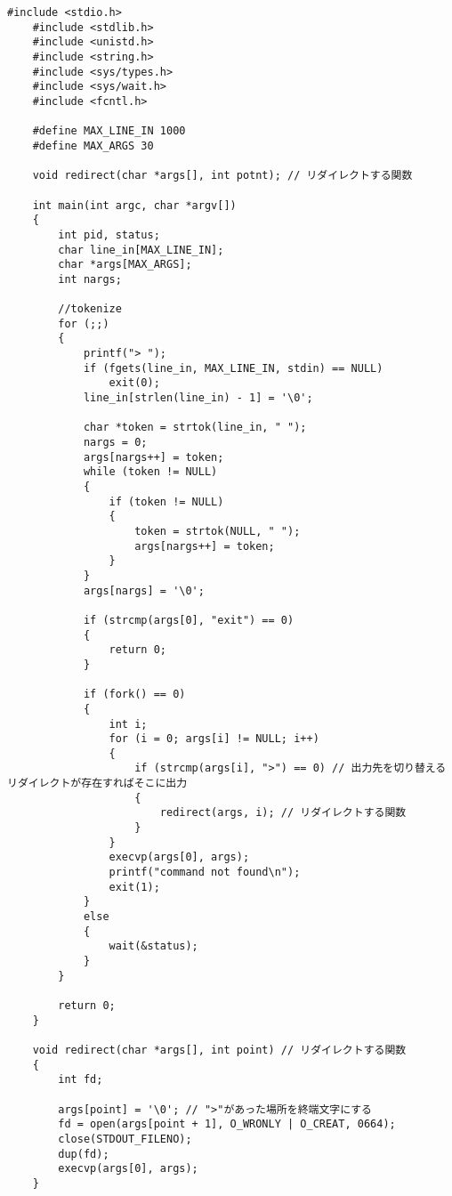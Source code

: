 \documentclass[12pt]{jarticle}
\begin{document}
\begin{lstlisting}[caption=kadai4.c,label=kadai4, style=lstC]
    #include <stdio.h>
    #include <stdlib.h>
    #include <unistd.h>
    #include <string.h>
    #include <sys/types.h>
    #include <sys/wait.h>
    #include <fcntl.h>
    
    #define MAX_LINE_IN 1000
    #define MAX_ARGS 30
    
    void redirect(char *args[], int potnt); // リダイレクトする関数
    
    int main(int argc, char *argv[])
    {
        int pid, status;
        char line_in[MAX_LINE_IN];
        char *args[MAX_ARGS];
        int nargs;
    
        //tokenize
        for (;;)
        {
            printf("> ");
            if (fgets(line_in, MAX_LINE_IN, stdin) == NULL)
                exit(0);
            line_in[strlen(line_in) - 1] = '\0';
    
            char *token = strtok(line_in, " ");
            nargs = 0;
            args[nargs++] = token;
            while (token != NULL)
            {
                if (token != NULL)
                {
                    token = strtok(NULL, " ");
                    args[nargs++] = token;
                }
            }
            args[nargs] = '\0';
    
            if (strcmp(args[0], "exit") == 0)
            {
                return 0;
            }
    
            if (fork() == 0)
            {
                int i;
                for (i = 0; args[i] != NULL; i++)
                {
                    if (strcmp(args[i], ">") == 0) // 出力先を切り替えるリダイレクトが存在すればそこに出力
                    {
                        redirect(args, i); // リダイレクトする関数
                    }
                }
                execvp(args[0], args);
                printf("command not found\n");
                exit(1);
            }
            else
            {
                wait(&status);
            }
        }
    
        return 0;
    }
    
    void redirect(char *args[], int point) // リダイレクトする関数
    {
        int fd;
    
        args[point] = '\0'; // ">"があった場所を終端文字にする
        fd = open(args[point + 1], O_WRONLY | O_CREAT, 0664);
        close(STDOUT_FILENO);
        dup(fd);
        execvp(args[0], args);
    }
\end{lstlisting}
\end{document}
